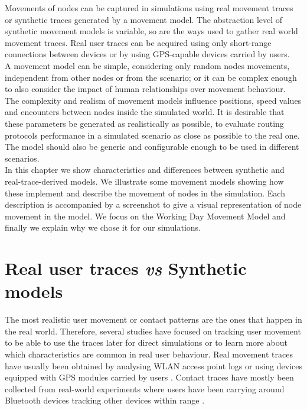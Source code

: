 Movements of nodes can be captured in simulations using real movement traces or synthetic traces generated by a movement model. The abstraction level of synthetic movement models is variable, so are the ways used to gather real world movement traces. Real user traces can be acquired using only short-range connections between devices or by using GPS-capable devices carried by users.
\\

A movement model can be simple, considering only random nodes movements, independent from other nodes or from the scenario; or it can be complex enough to also consider the impact of human relationships over movement behaviour. The complexity and realism of movement models influence positions, speed values and encounters between nodes inside the simulated world. It is desirable that these parameters be generated as realistically as possible, to evaluate routing protocols performance in a simulated scenario as close as possible to the real one. The model should also be generic and configurable enough to be used in different scenarios.
\\

In this chapter we show characteristics and differences between synthetic and real-trace-derived models. We illustrate some movement models showing how these implement and describe the movement of nodes in the simulation. Each description is accompanied by a screenshot to give a visual representation of node movement in the model. We focus on the Working Day Movement Model and finally we explain why we chose it for our simulations.

\section{Real user traces \textit{vs} Synthetic models}
The most realistic user movement or contact patterns are the ones that happen in the real world. Therefore, several studies have focused on tracking user movement to be able to use the traces later for direct simulations or to learn more about which characteristics are common in real user behaviour. Real movement traces have usually been obtained by analysing WLAN access point logs \cite{Balachandran:2002:CUB:511399.511359} \cite{Ghosh:2006:PMP:1132983.1132993} \cite{Shaffer:2005:AMM:1104998.1105285} or using devices equipped with GPS modules carried by users \cite{Ashbrook:2002:LSL:862896.881068}. Contact traces have mostly been collected from real-world experiments where users have been carrying around Bluetooth devices tracking other devices within range \cite{Natarajan:2007:UUI:1762888.1762904}.
\\

